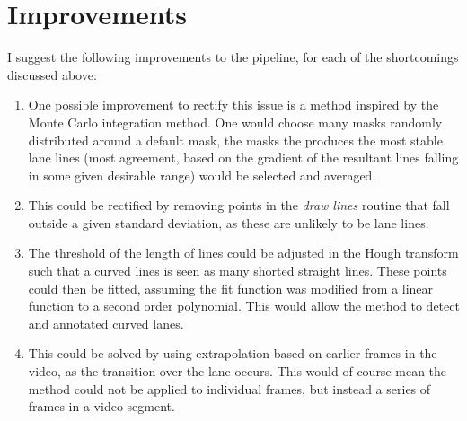 \documentclass[letterpaper,12pt]{article}
\begin{document}
\section{Improvements}
I suggest the following improvements to the pipeline, for each of the shortcomings discussed above:
\begin{enumerate}
\item One possible improvement to rectify this issue is a method inspired by the Monte Carlo integration method. One would choose many masks randomly distributed around a default mask, the masks the produces the most stable lane lines (most agreement, based on the gradient of the resultant lines falling in some given desirable range) would be selected and averaged.
\item This could be rectified by removing points in the \textit{draw lines} routine that fall outside a given standard deviation, as these are unlikely to be lane lines.
\item The threshold of the length of lines could be adjusted in the Hough transform such that a curved lines is seen as many shorted straight lines. These points could then be fitted, assuming the fit function was modified from a linear function to a second order polynomial. This would allow the method to detect and annotated curved lanes.
\item This could be solved by using extrapolation based on earlier frames in the video, as the transition over the lane occurs. This would of course mean the method could not be applied to individual frames, but instead a series of frames in a video segment.
\end{enumerate}
\end{document}
